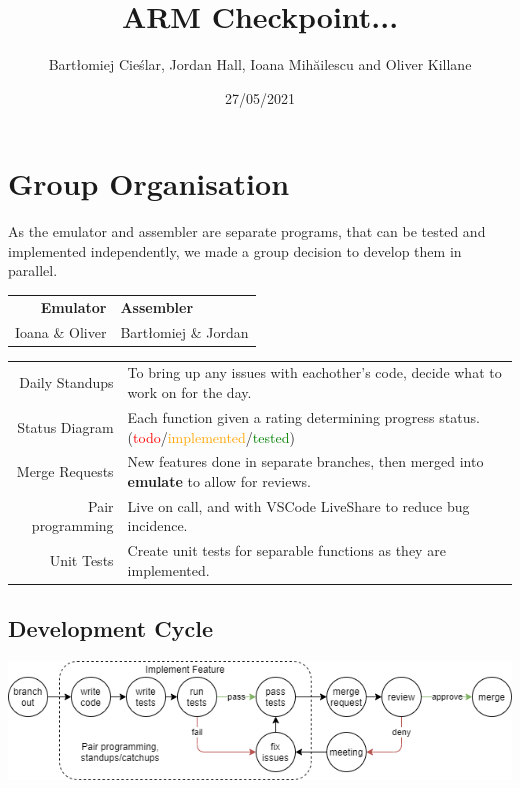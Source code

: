 \documentclass[11pt]{article}
\begin{document}
\title{ARM Checkpoint... }
\author{Bartłomiej Cieślar, Jordan Hall, Ioana Mihăilescu and Oliver Killane}
\date{27/05/2021}

\maketitle

\section{Group Organisation}
    As the emulator and assembler are separate programs, that can be tested and implemented independently, we made a group decision to develop them in parallel.
    \begin{center}
        \begin{tabular}{ r | l }
            \textbf{Emulator} & \textbf{Assembler} \\
            Ioana \& Oliver & Bartłomiej \& Jordan \\
        \end{tabular}
    \end{center}
    \begin{center}
        \begin{tabular}{r l}
            Daily Standups & To bring up any issues with eachother's code, decide what to work on for the day. \\
            Status Diagram & Each function given a rating determining progress status. (\textcolor{red}{todo}/\textcolor{orange}{implemented}/\textcolor{green}{tested}) \\
            Merge Requests & New features done in separate branches, then merged into \textbf{emulate} to allow for reviews. \\
            Pair programming & Live on call, and with VSCode LiveShare to reduce bug incidence. \\
            Unit Tests & Create unit tests for separable functions as they are implemented. \\
        \end{tabular}
    \end{center}
    \subsection*{Development Cycle}
        \begin{center}
            \includegraphics[width = \textwidth]{development cycle}
        \end{center}
\end{document}

